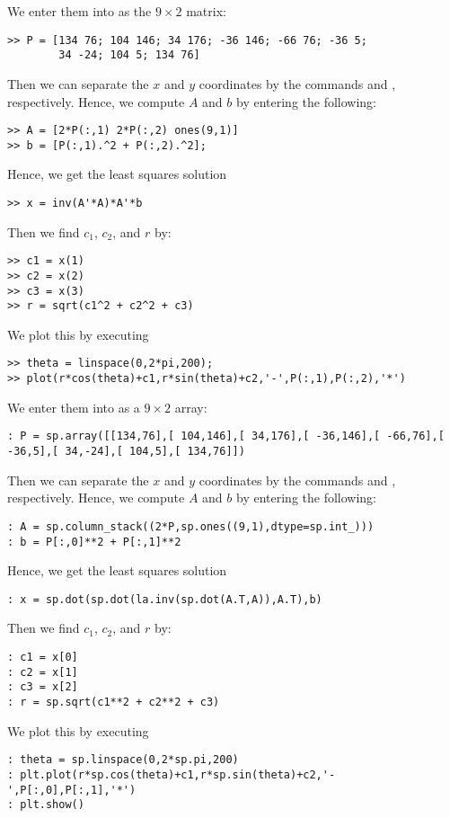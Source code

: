 \begin{matlab}
 We enter them into \ProgrammingLanguage as the $9\times 2$ matrix:
\begin{lstlisting}[style=matlab]
>> P = [134 76; 104 146; 34 176; -36 146; -66 76; -36 5; 
        34 -24; 104 5; 134 76]
\end{lstlisting}
Then we can separate the $x$ and $y$ coordinates by the commands  and , respectively.  Hence, we compute $A$ and $b$ by entering the following:
\begin{lstlisting}[style=matlab]
>> A = [2*P(:,1) 2*P(:,2) ones(9,1)]
>> b = [P(:,1).^2 + P(:,2).^2];
\end{lstlisting}
Hence, we get the least squares solution
\begin{lstlisting}[style=matlab]
>> x = inv(A'*A)*A'*b
\end{lstlisting}
Then we find $c_1$, $c_2$, and $r$ by:
\begin{lstlisting}[style=matlab]
>> c1 = x(1)
>> c2 = x(2)
>> c3 = x(3)
>> r = sqrt(c1^2 + c2^2 + c3)
\end{lstlisting}
We plot this by executing
\begin{lstlisting}[style=matlab]
>> theta = linspace(0,2*pi,200);
>> plot(r*cos(theta)+c1,r*sin(theta)+c2,'-',P(:,1),P(:,2),'*')
\end{lstlisting}
\end{matlab}
\begin{python}
We enter them into \ProgrammingLanguage as a $9\times 2$ array:
\begin{lstlisting}[style=python]
: P = sp.array([[134,76],[ 104,146],[ 34,176],[ -36,146],[ -66,76],[ -36,5],[ 34,-24],[ 104,5],[ 134,76]])
\end{lstlisting}
Then we can separate the $x$ and $y$ coordinates by the commands  and , respectively.  Hence, we compute $A$ and $b$ by entering the following:
\begin{lstlisting}[style=python]
: A = sp.column_stack((2*P,sp.ones((9,1),dtype=sp.int_)))
: b = P[:,0]**2 + P[:,1]**2
\end{lstlisting}
Hence, we get the least squares solution
\begin{lstlisting}[style=python]
: x = sp.dot(sp.dot(la.inv(sp.dot(A.T,A)),A.T),b)
\end{lstlisting}
Then we find $c_1$, $c_2$, and $r$ by:
\begin{lstlisting}[style=python]
: c1 = x[0]
: c2 = x[1]
: c3 = x[2]
: r = sp.sqrt(c1**2 + c2**2 + c3)
\end{lstlisting}
We plot this by executing
\begin{lstlisting}[style=python]
: theta = sp.linspace(0,2*sp.pi,200)
: plt.plot(r*sp.cos(theta)+c1,r*sp.sin(theta)+c2,'-',P[:,0],P[:,1],'*')
: plt.show()
\end{lstlisting}
\end{python}

